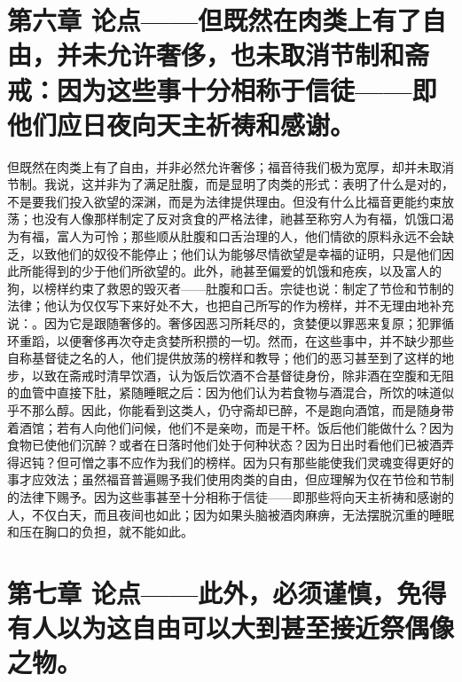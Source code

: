 
\section{第六章 论点——但既然在肉类上有了自由，并未允许奢侈，也未取消节制和斋戒：因为这些事十分相称于信徒——即他们应日夜向天主祈祷和感谢。}

但既然在肉类上有了自由，并非必然允许奢侈；福音待我们极为宽厚，却并未取消节制。我说，这并非为了满足肚腹，而是显明了肉类的形式：表明了什么是对的，不是要我们投入欲望的深渊，而是为法律提供理由。但没有什么比福音更能约束放荡；也没有人像那样制定了反对贪食的严格法律，祂甚至称穷人为有福，饥饿口渴为有福，富人为可怜；那些顺从肚腹和口舌治理的人，他们情欲的原料永远不会缺乏，以致他们的奴役不能停止；他们认为能够尽情欲望是幸福的证明，只是他们因此所能得到的少于他们所欲望的。此外，祂甚至偏爱的饥饿和疮疾，以及富人的狗，以榜样约束了救恩的毁灭者——肚腹和口舌。宗徒也说：制定了节俭和节制的法律；他认为仅仅写下来好处不大，也把自己所写的作为榜样，并不无理由地补充说：。因为它是跟随奢侈的。奢侈因恶习所耗尽的，贪婪便以罪恶来复原；犯罪循环重蹈，以便奢侈再次夺走贪婪所积攒的一切。然而，在这些事中，并不缺少那些自称基督徒之名的人，他们提供放荡的榜样和教导；他们的恶习甚至到了这样的地步，以致在斋戒时清早饮酒，认为饭后饮酒不合基督徒身份，除非酒在空腹和无阻的血管中直接下肚，紧随睡眠之后：因为他们认为若食物与酒混合，所饮的味道似乎不那么醇。因此，你能看到这类人，仍守斋却已醉，不是跑向酒馆，而是随身带着酒馆；若有人向他们问候，他们不是亲吻，而是干杯。饭后他们能做什么？因为食物已使他们沉醉？或者在日落时他们处于何种状态？因为日出时看他们已被酒弄得迟钝？但可憎之事不应作为我们的榜样。因为只有那些能使我们灵魂变得更好的事才应效法；虽然福音普遍赐予我们使用肉类的自由，但应理解为仅在节俭和节制的法律下赐予。因为这些事甚至十分相称于信徒——即那些将向天主祈祷和感谢的人，不仅白天，而且夜间也如此；因为如果头脑被酒肉麻痹，无法摆脱沉重的睡眠和压在胸口的负担，就不能如此。\par


\section{第七章 论点——此外，必须谨慎，免得有人以为这自由可以大到甚至接近祭偶像之物。}

